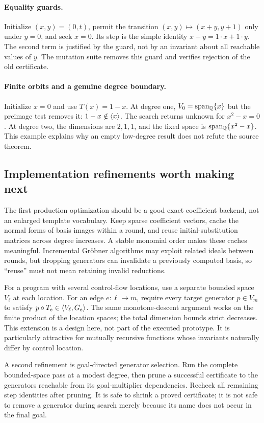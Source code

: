 \paragraph{Equality guards.}
Initialize $(x,y)=(0,t)$, permit the transition
$(x,y)\mapsto(x+y,y+1)$ only under $y=0$, and seek $x=0$. Its step is the simple
identity $x+y=1\cdot x+1\cdot y$. The second term is justified by the guard,
not by an invariant about all reachable values of $y$. The mutation suite
removes this guard and verifies rejection of the old certificate.

\paragraph{Finite orbits and a genuine degree boundary.}
Initialize $x=0$ and use $T(x)=1-x$. At degree one, $V_0=\operatorname{span_{\mathbb{Q}}}\{x\}$ but the
preimage test removes it: $1-x\notin\left\langle x\right\rangle$. The search returns unknown for
$x^2-x=0$. At degree two, the dimensions are $2,1,1$, and the fixed space is
$\operatorname{span_{\mathbb{Q}}}\{x^2-x\}$. This example explains why an empty low-degree result does not
refute the source theorem.

\subsection{Implementation refinements worth making next}

The first production optimization should be a good exact coefficient backend,
not an enlarged template vocabulary. Keep sparse coefficient vectors, cache the
normal forms of basis images within a round, and reuse initial-substitution
matrices across degree increases. A stable monomial order makes these caches
meaningful. Incremental Gr\"obner algorithms may exploit related ideals between
rounds, but dropping generators can invalidate a previously computed basis, so
``reuse'' must not mean retaining invalid reductions.

For a program with several control-flow locations, use a separate bounded
space $V_\ell$ at each location. For an edge $e:\ell\to m$, require every target
generator $p\in V_m$ to satisfy $p\circ T_e\in\left\langle V_\ell,G_e\right\rangle$. The same
monotone-descent argument works on the finite product of the location spaces;
the total dimension bounds strict decreases. This extension is a design here,
not part of the executed prototype. It is particularly attractive for mutually
recursive functions whose invariants naturally differ by control location.

A second refinement is goal-directed generator selection. Run the complete
bounded-space pass at a modest degree, then prune a successful certificate to
the generators reachable from its goal-multiplier dependencies. Recheck all
remaining step identities after pruning. It is safe to shrink a proved
certificate; it is not safe to remove a generator during search merely because
its name does not occur in the final goal.
